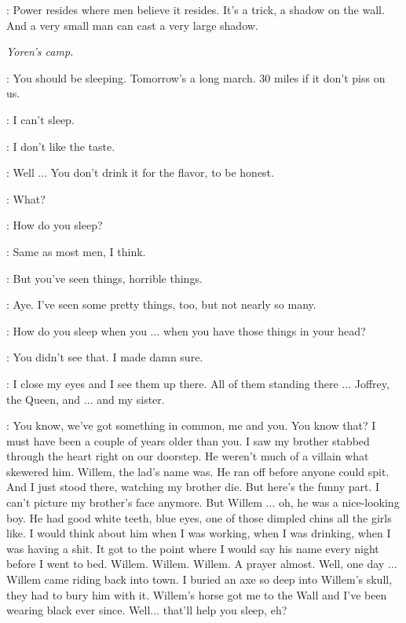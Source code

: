 \VARYS: Power resides where men believe it resides. It's a trick, a shadow on the wall. And a very small man can cast a very large shadow. 


\scene

\textit{Yoren's camp.} 


\YOREN: You should be sleeping. Tomorrow's a long march. 30 miles if it don't piss on us. 

\ARYA: I can't sleep. 


\ARYA: I don't like the taste. 

\YOREN: Well $\ldots$ You don't drink it for the flavor, to be honest. 


\YOREN: What? 

\ARYA: How do you sleep? 

\YOREN: Same as most men, I think. 

\ARYA: But you've seen things, horrible things. 

\YOREN: Aye. I've seen some pretty things, too, but not nearly so many. 

\ARYA: How do you sleep when you $\ldots$ when you have those things in your head? 

\YOREN: You didn't see that. I made damn sure. 

\ARYA: I close my eyes and I see them up there. All of them standing there $\ldots$ Joffrey, the Queen, and $\ldots$ and my sister. 

\YOREN: You know, we've got something in common, me and you. You know that? I must have been a couple of years older than you. I saw my brother stabbed through the heart right on our doorstep. He weren't much of a villain what skewered him. Willem, the lad's name was. He ran off before anyone could spit. And I just stood there, watching my brother die. But here's the funny part. I can't picture my brother's face anymore. But Willem $\ldots$ oh, he was a nice-looking boy. He had good white teeth, blue eyes, one of those dimpled chins all the girls like. I would think about him when I was working, when I was drinking, when I was having a shit. It got to the point where I would say his name every night before I went to bed. Willem. Willem. Willem. A prayer almost. Well, one day $\ldots$ Willem came riding back into town. I buried an axe so deep into Willem's skull, they had to bury him with it. Willem's horse got me to the Wall and I've been wearing black ever since. Well$\ldots$ that'll help you sleep, eh? 

